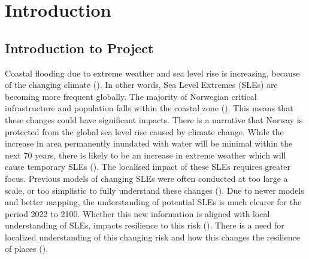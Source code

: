 




\chapter{Introduction}
\section{Introduction to Project}
Coastal flooding due to extreme weather and sea level rise is increasing, because of the changing climate (\cite{hoffken_effects_2020}).  In other words, Sea Level Extremes (SLEs) are becoming more frequent globally. The majority of Norwegian critical infrastructure and population falls within the coastal zone (\cite{engebakken_construction_2022}). This means that these changes could have significant impacts. There is a narrative that Norway is protected from the global sea level rise caused by climate change. While the increase in area permanently inundated with water will be minimal within the next 70 years, there is likely to be an increase in extreme weather which will cause temporary SLEs (\cite{aunan_strong_2008}). The localised impact of these SLEs requires greater focus. Previous models of changing SLEs were often conducted at too large a scale, or too simplistic to fully understand these changes (\cite{hoffken_effects_2020}). Due to newer models and better mapping, the understanding of potential SLEs is much clearer for the period 2022 to 2100. Whether this new information is aligned with local understanding of SLEs, impacts resilience to this risk (\cite{setten_we_2019}).  There is a need for localized understanding of this changing risk and how this changes the resilience of places (\cite{rod_integrated_2012}).
